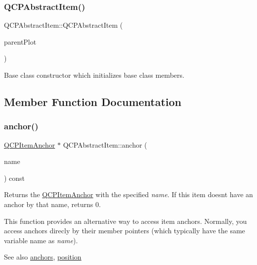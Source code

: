 \subsubsection{\texorpdfstring{Q\+C\+P\+Abstract\+Item()}{QCPAbstractItem()}}
{\footnotesize\ttfamily Q\+C\+P\+Abstract\+Item\+::\+Q\+C\+P\+Abstract\+Item (\begin{DoxyParamCaption}\item[{\hyperlink{class_q_custom_plot}{Q\+Custom\+Plot} $\ast$}]{parent\+Plot }\end{DoxyParamCaption})\hspace{0.3cm}{\ttfamily [explicit]}}

Base class constructor which initializes base class members. 

\subsection{Member Function Documentation}
\mbox{\label{class_q_c_p_abstract_item_a139c255ea8831642fac91748e29a5adb}} 
\subsubsection{\texorpdfstring{anchor()}{anchor()}}
{\footnotesize\ttfamily \hyperlink{class_q_c_p_item_anchor}{Q\+C\+P\+Item\+Anchor} $\ast$ Q\+C\+P\+Abstract\+Item\+::anchor (\begin{DoxyParamCaption}\item[{const Q\+String \&}]{name }\end{DoxyParamCaption}) const}

Returns the \hyperlink{class_q_c_p_item_anchor}{Q\+C\+P\+Item\+Anchor} with the specified {\itshape name}. If this item doesn\textquotesingle{}t have an anchor by that name, returns 0.

This function provides an alternative way to access item anchors. Normally, you access anchors direcly by their member pointers (which typically have the same variable name as {\itshape name}).

\begin{DoxySeeAlso}{See also}
\hyperlink{class_q_c_p_abstract_item_a81d1ecfea3368b836cf9675a0045e659}{anchors}, \hyperlink{class_q_c_p_abstract_item_a2589c3d298f9a576d77d9addb440a18d}{position} 
\end{DoxySeeAlso}
\mbox{\label{class_q_c_p_abstract_item_a81d1ecfea3368b836cf9675a0045e659}} 
